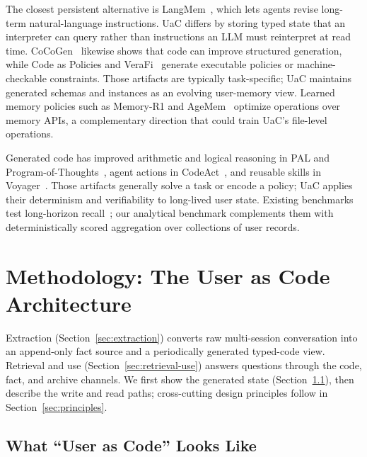 The closest persistent alternative is LangMem~\citep{langmem2025}, which lets agents revise long-term natural-language instructions. UaC differs by storing typed state that an interpreter can query rather than instructions an LLM must reinterpret at read time. CoCoGen~\citep{madaan2022cocogen} likewise shows that code can improve structured generation, while Code as Policies and VeraFi~\citep{liang2023codeaspolicies,akinfaderin2025verafi} generate executable policies or machine-checkable constraints. Those artifacts are typically task-specific; UaC maintains generated schemas and instances as an evolving user-memory view. Learned memory policies such as Memory-R1 and AgeMem~\citep{yan2025memoryr1,yu2026agemem} optimize operations over memory APIs, a complementary direction that could train UaC's file-level operations.

Generated code has improved arithmetic and logical reasoning in PAL and Program-of-Thoughts~\citep{gao2023pal,chen2023pot}, agent actions in CodeAct~\citep{wang2024codeact}, and reusable skills in Voyager~\citep{wang2024voyager}. Those artifacts generally solve a task or encode a policy; UaC applies their determinism and verifiability to long-lived user state. Existing benchmarks test long-horizon recall~\citep{maharana2024locomo,wu2025longmemeval}; our analytical benchmark complements them with deterministically scored aggregation over collections of user records.


\section{Methodology: The User as Code Architecture}
\label{sec:method}

Extraction (Section~\ref{sec:extraction}) converts raw multi-session conversation into an append-only fact source and a periodically generated typed-code view. Retrieval and use (Section~\ref{sec:retrieval-use}) answers questions through the code, fact, and archive channels. We first show the generated state (Section~\ref{sec:code-example}), then describe the write and read paths; cross-cutting design principles follow in Section~\ref{sec:principles}.

\subsection{What ``User as Code'' Looks Like}
\label{sec:code-example}

